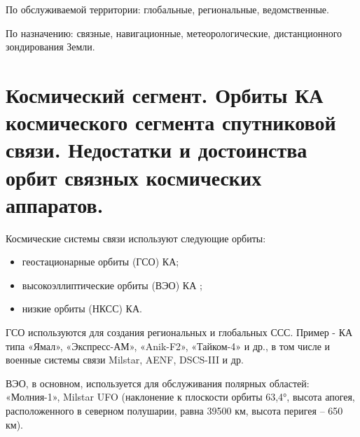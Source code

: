 \documentclass[14pt,a4paper,oneside]{extarticle}
\begin{document}
По обслуживаемой территории: глобальные, региональные, ведомственные.

По назначению: связные, навигационные, метеорологические, дистанционного зондирования Земли.

\section{Космический сегмент. Орбиты КА космического сегмента спутниковой связи. Недостатки и достоинства орбит связных космических аппаратов.}

Космические системы связи используют следующие орбиты:

\begin{itemize}
    \item геостационарные орбиты (ГСО) КА;
    \item высокоэллиптические орбиты (ВЭО) КА ;
    \item низкие орбиты (НКСС) КА.
\end{itemize}


ГСО используются для создания региональных и глобальных ССС. Пример - КА типа «Ямал», «Экспресс-АМ», «Anik-F2», «Тайком-4» и др., в том числе и военные системы связи Milstar, AENF, DSCS-III  и др.

ВЭО, в основном, используется для обслуживания полярных областей: «Молния-1», Milstar UFO (наклонение к плоскости орбиты 63,4°,  высота апогея, расположенного в северном полушарии, равна 39500 км, высота перигея – 650 км).
\end{document}
